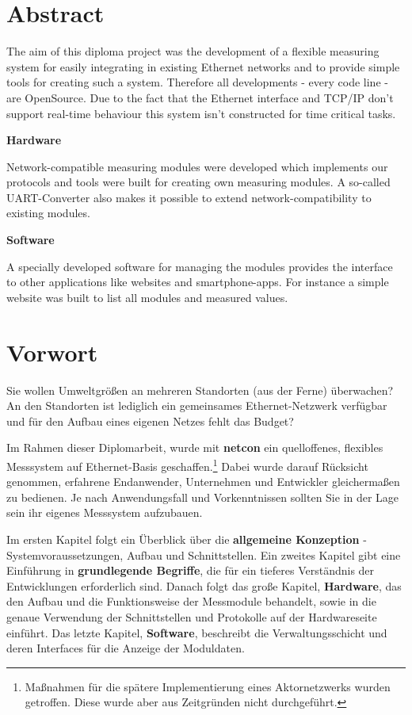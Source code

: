 \documentclass[a4paper,14pt,headsepline]{scrartcl}
\begin{document}
\section*{Abstract}
The aim of this diploma project was the development of a flexible measuring system for easily integrating in existing Ethernet networks and to provide simple tools for creating such a system. Therefore all developments - every code line - are OpenSource. Due to the fact that the Ethernet interface and TCP/IP don't support real-time behaviour this system isn't constructed for time critical tasks. 

\textbf{Hardware}

Network-compatible measuring modules were developed which implements our protocols and tools were built for creating own measuring modules. A so-called UART-Converter also makes it possible to extend network-compatibility to existing modules. 

\textbf{Software}

A specially developed software for managing the modules provides the interface to other applications like websites and smartphone-apps. For instance a simple website was built to list all modules and measured values.


\newpage

\section*{Vorwort}
Sie wollen Umweltgrößen an mehreren Standorten (aus der Ferne) überwachen? An den Standorten ist lediglich ein gemeinsames Ethernet-Netzwerk verfügbar und für den Aufbau eines eigenen Netzes fehlt das Budget?

Im Rahmen dieser Diplomarbeit, wurde mit \textbf{netcon} ein quelloffenes, flexibles Messsystem auf Ethernet-Basis geschaffen.\footnote{Maßnahmen für die spätere Implementierung eines Aktornetzwerks wurden getroffen. Diese wurde aber aus Zeitgründen nicht durchgeführt. } Dabei wurde darauf Rücksicht genommen, erfahrene Endanwender, Unternehmen und Entwickler gleichermaßen zu bedienen. Je nach Anwendungsfall und Vorkenntnissen sollten Sie in der Lage sein ihr eigenes Messsystem aufzubauen. 

Im ersten Kapitel folgt ein Überblick über die \textbf{allgemeine Konzeption} - Systemvoraussetzungen, Aufbau und Schnittstellen. Ein zweites Kapitel gibt eine Einführung in \textbf{grundlegende Begriffe}, die für ein tieferes Verständnis der Entwicklungen erforderlich sind. Danach folgt das große Kapitel, \textbf{Hardware}, das den Aufbau und die Funktionsweise der Messmodule behandelt, sowie in die genaue Verwendung der Schnittstellen und Protokolle auf der Hardwareseite einführt. Das letzte Kapitel, \textbf{Software}, beschreibt die Verwaltungsschicht und deren Interfaces für die Anzeige der Moduldaten.
\end{document}
